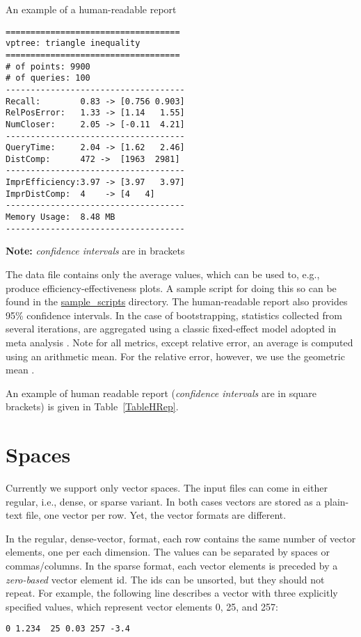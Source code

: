 \documentclass[runningheads,a4paper]{llncs}
\begin{document}
{\begin{wraptable}{R}{0.52\textwidth}
\caption{An example of a human-readable report 
\label{TableHRep}}
\begin{verbatim}
===================================
vptree: triangle inequality
===================================
# of points: 9900
# of queries: 100
------------------------------------
Recall:        0.83 -> [0.756 0.903]
RelPosError:   1.33 -> [1.14   1.55]
NumCloser:     2.05 -> [-0.11  4.21]
------------------------------------
QueryTime:     2.04 -> [1.62   2.46]
DistComp:      472 ->  [1963  2981]
------------------------------------
ImprEfficiency:3.97 -> [3.97   3.97]
ImprDistComp:  4    -> [4   4]
------------------------------------
Memory Usage:  8.48 MB
------------------------------------
\end{verbatim}
\textbf{Note:} \emph{confidence intervals} are in brackets
\vspace{-4em}
\end{wraptable}

The data file contains only the average values,
which can be used to, e.g., produce efficiency-effectiveness plots.
A sample script for doing this so can be found in the \href{https://github.com/searchivarius/NonMetricSpaceLib/blob/master/sample_scripts/nips2013/figures/all.sh}{sample\_scripts} directory.
The human-readable report also provides 95\% confidence intervals.
In the case of bootstrapping, statistics collected from several iterations,
are aggregated using a classic fixed-effect model adopted in meta analysis \cite{Hedges_and_Vevea:1998}.
Note for all metrics, except relative error, an average is computed using an arithmetic mean.
For the relative error, however, we use the geometric mean  \cite{king:1986}.

An example of human readable report (\emph{confidence intervals} are in square brackets)
is given in Table~\ref{TableHRep}.

\section{Spaces}\label{SectionSpaces}
Currently we support only vector spaces.
The input files can come in either regular, i.e., dense,
or sparse variant. 
In both cases vectors are stored
as a plain-text file, one vector per row.
Yet, the vector formats are different.

In the regular, dense-vector, format, each row
contains the same number of vector elements, one per each dimension.
The values can be separated by spaces or commas/columns.
In the sparse format, each vector elements is preceded
by a \emph{zero-based} vector element id. 
The ids can be unsorted, but they should not repeat.
For example, the following line
describes a vector with three explicitly specified values,
which represent vector elements 0, 25, and 257:
\begin{verbatim}
0 1.234  25 0.03 257 -3.4 
\end{verbatim}

}
\end{document}
